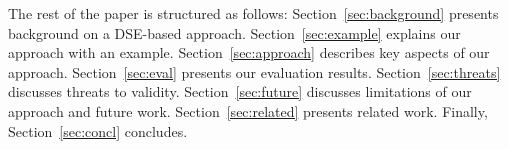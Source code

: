 The rest of the paper is structured as follows:
Section~\ref{sec:background} presents background on a DSE-based approach.
Section~\ref{sec:example} explains our approach with an example.
Section~\ref{sec:approach} describes key aspects of our approach.
Section~\ref{sec:eval} presents our evaluation results.
Section~\ref{sec:threats} discusses threats to validity.
Section~\ref{sec:future} discusses limitations of our approach and future work.
Section~\ref{sec:related} presents related work.
Finally, Section~\ref{sec:concl} concludes. 





